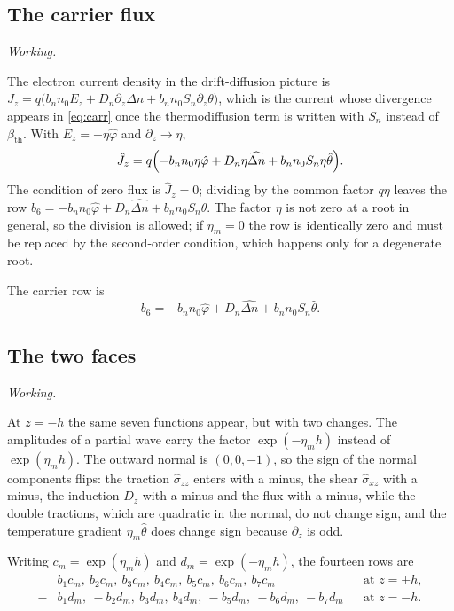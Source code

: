 \documentclass[11pt,a4paper]{article}
\newif\ifshowworked \showworkedtrue
\newenvironment{worked}{\ifshowworked\par\smallskip\noindent\textit{Working.}\par\else\setbox0\vbox\bgroup\fi}{\ifshowworked\par\smallskip\else\egroup\fi}
\newcommand{\bth}{\beta_{\mathrm{th}}}
\newcommand{\bp}{\hat\varphi}
\newcommand{\bn}{\widehat{\Delta n}}
\newcommand{\bt}{\hat\theta}
\begin{document}
\subsection{The carrier flux}

\begin{worked}
The electron current density in the drift-diffusion picture is
$J_z=q\bigl(b_nn_0E_z+D_n\partial_z\Delta n+b_nn_0S_n\partial_z\theta\bigr)$, which is the current whose
divergence appears in \eqref{eq:carr} once the thermodiffusion term is written with $S_n$ instead of $\bth$.
With $E_z=-\eta\bp$ and $\partial_z\to\eta$,
\[
\hat J_z=q\Bigl(-b_nn_0\eta\bp+D_n\eta\bn+b_nn_0S_n\eta\bt\Bigr).
\]
The condition of zero flux is $\hat J_z=0$; dividing by the common factor $q\eta$ leaves the row
$b_6=-b_nn_0\bp+D_n\bn+b_nn_0S_n\bt$. The factor $\eta$ is not zero at a root in general, so the division is
allowed; if $\eta_m=0$ the row is identically zero and must be replaced by the second-order condition,
which happens only for a degenerate root.
\end{worked}

\noindent The carrier row is
\begin{equation}\label{eq:b6}
b_6=-b_nn_0\bp+D_n\bn+b_nn_0S_n\bt .
\end{equation}

\subsection{The two faces}

\begin{worked}
At $z=-h$ the same seven functions appear, but with two changes. The amplitudes of a partial wave carry the
factor $\exp(-\eta_mh)$ instead of $\exp(\eta_mh)$. The outward normal is $(0,0,-1)$, so the sign of the
normal components flips: the traction $\hat\sigma_{zz}$ enters with a minus, the shear $\hat\sigma_{xz}$ with
a minus, the induction $D_z$ with a minus and the flux with a minus, while the double tractions, which are
quadratic in the normal, do not change sign, and the temperature gradient $\eta_m\hat\theta$ does change
sign because $\partial_z$ is odd.
\end{worked}

\noindent Writing $c_m=\exp(\eta_mh)$ and $d_m=\exp(-\eta_mh)$, the fourteen rows are
\begin{equation}\label{eq:rows}
\begin{aligned}
&b_1c_m,\ b_2c_m,\ b_3c_m,\ b_4c_m,\ b_5c_m,\ b_6c_m,\ b_7c_m &&\text{at } z=+h,\\
-&b_1d_m,\ -b_2d_m,\ b_3d_m,\ b_4d_m,\ -b_5d_m,\ -b_6d_m,\ -b_7d_m &&\text{at } z=-h .
\end{aligned}
\end{equation}
\end{document}
